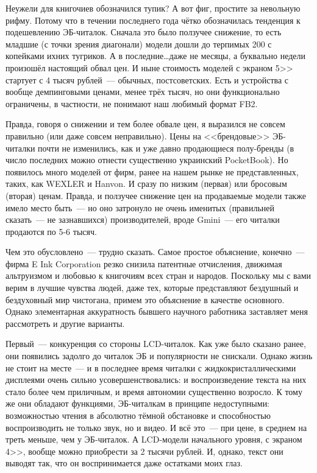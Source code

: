 Неужели для книгочиев обозначился тупик? А вот фиг, простите за невольную рифму. Потому что в течении последнего года чётко обозначилась тенденция к подешевлению ЭБ-читалок. Сначала это было ползучее снижение, то есть младшие (с точки зрения диагонали) модели дошли до терпимых 200 с копейками ихних тугриков. А в последние\dots даже не месяцы, а буквально недели произошёл настоящий обвал цен. И ныне стоимость моделей с экраном 5>> стартует с 4 тысяч рублей~--- обычных, постсоветских. Есть и устройства с вообще демпинговыми ценами, менее трёх тысяч, но они функционально ограничены, в частности, не понимают наш любимый формат FB2.

Правда, говоря о снижении и тем более обвале цен, я выразился не совсем правильно (или даже совсем неправильно). Цены на <<брендовые>> ЭБ-читалки почти не изменились, как и уже давно продающиеся полу-бренды (в число последних можно отнести существенно украинский PocketBook). Но появилось много моделей от фирм, ранее на нашем рынке не представленных, таких, как WEXLER и Hanvon. И сразу по низким (первая) или бросовым (вторая) ценам. Правда, и ползучее  снижение цен на продаваемые модели также имело место быть~--- но оно затронуло не очень именитых (правильней сказать~--- не зазнавшихся) производителей, вроде Gmini~--- его читалки продаются по 5-6 тысяч.

Чем это обусловлено~--- трудно сказать. Самое простое объяснение, конечно~--- фирма E Ink Corporation резко снизила патентные отчисления, движимая альтруизмом и любовью к книгочиям всех стран и народов. Поскольку мы с вами верим в лучшие чувства людей, даже тех, которые представляют бездушный и бездуховный мир чистогана, примем это объяснение в качестве основного. Однако элементарная аккуратность бывшего научного работника заставляет меня рассмотреть и другие варианты.

Первый~--- конкуренция со стороны LCD-читалок. Как уже было сказано ранее, они появились задолго до читалок ЭБ и популярности не снискали. Однако жизнь не стоит на месте~--- и в последнее время читалки с жидкокристаллическими дисплеями очень сильно усовершенствовались: и воспроизведение текста на них стало более чем приличным, и время автономии существенно возросло. К тому же они обладают функциями, ЭБ-читалкам в принципе недоступными: возможностью чтения в абсолютно тёмной обстановке и способностью воспроизводить не только звук, но и видео. И всё это~--- при цене, в среднем на треть меньше, чем у ЭБ-читалок. А LCD-модели начального уровня, с экраном 4>>, вообще можно приобрести за 2 тысячи рублей. И, однако, текст они выводят так, что он воспринимается даже остатками моих глаз.

